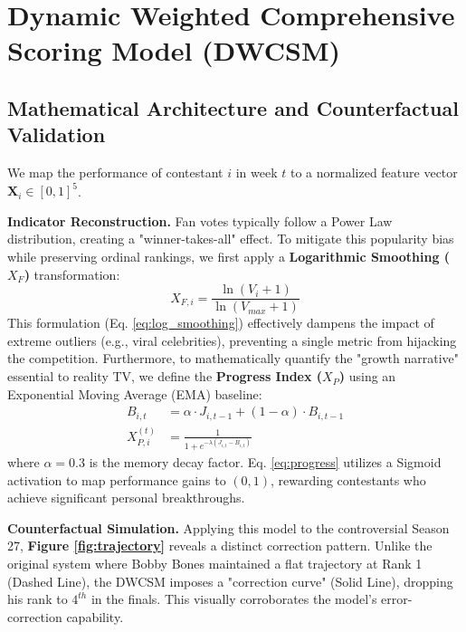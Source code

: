 \documentclass{mcmthesis}
\begin{document}
\section{Dynamic Weighted Comprehensive Scoring Model (DWCSM)}

\subsection{Mathematical Architecture and Counterfactual Validation}
We map the performance of contestant $i$ in week $t$ to a normalized feature vector $\mathbf{X}_i \in [0,1]^5$.

\noindent \textbf{Indicator Reconstruction.}
Fan votes typically follow a Power Law distribution, creating a "winner-takes-all" effect. To mitigate this popularity bias while preserving ordinal rankings, we first apply a \textbf{Logarithmic Smoothing ($X_F$)} transformation:
\begin{equation}
	X_{F,i} = \frac{\ln(V_i + 1)}{\ln(V_{max} + 1)} 
	\label{eq:log_smoothing}
\end{equation}
This formulation (Eq. \ref{eq:log_smoothing}) effectively dampens the impact of extreme outliers (e.g., viral celebrities), preventing a single metric from hijacking the competition. Furthermore, to mathematically quantify the "growth narrative" essential to reality TV, we define the \textbf{Progress Index ($X_P$)} using an Exponential Moving Average (EMA) baseline:
\begin{align}
	B_{i,t} &= \alpha \cdot J_{i,t-1} + (1 - \alpha) \cdot B_{i,t-1} \\
	X_{P,i}^{(t)} &= \frac{1}{1 + e^{-\lambda(J_{i,t} - B_{i,t})}} \label{eq:progress}
\end{align}
where $\alpha=0.3$ is the memory decay factor. Eq. \ref{eq:progress} utilizes a Sigmoid activation to map performance gains to $(0, 1)$, rewarding contestants who achieve significant personal breakthroughs.

\noindent \textbf{Counterfactual Simulation.}
Applying this model to the controversial Season 27, \textbf{Figure \ref{fig:trajectory}} reveals a distinct correction pattern. Unlike the original system where Bobby Bones maintained a flat trajectory at Rank 1 (Dashed Line), the DWCSM imposes a "correction curve" (Solid Line), dropping his rank to $4^{th}$ in the finals. This visually corroborates the model's error-correction capability.
\end{document}
